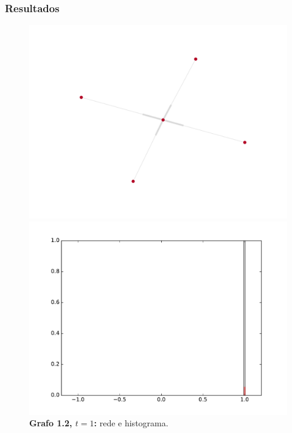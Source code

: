 \begin{frame}
  \frametitle{Resultados}

  \begin{figure}
  \centering
  \begin{minipage}{5.5cm}
    \includegraphics[width=\textwidth]{./figures/12N1}
  \end{minipage}
  \begin{minipage}{5.5cm}
    \includegraphics[width=\textwidth]{./figures/12H1}
  \end{minipage}
  \vspace{5mm}
  \caption*{\textbf{Grafo 1.2, $t = 1$:} rede e histograma.}
  \end{figure}
\end{frame}


